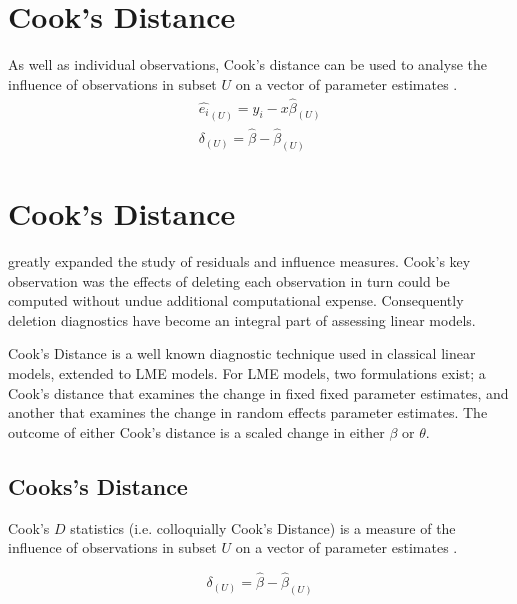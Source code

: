 \documentclass[12pt, a4paper]{article}
\begin{document}
	\section{Cook's Distance}
	As well as individual observations, Cook's distance can be used to analyse the influence of observations in subset $U$ on a vector of parameter estimates \citep{cook77}.
	\begin{eqnarray}
	\hat{e_{i}}_{(U)} = y_{i} - x\hat{\beta}_{(U)}\\
	\delta_{(U)} = \hat{\beta} - \hat{\beta}_{(U)}
	\end{eqnarray}

\section{Cook's Distance} %

\citet{cook77} greatly expanded the study of residuals and influence measures. Cook's key observation was the effects of deleting each observation in turn could be computed without undue additional computational expense. Consequently deletion diagnostics have become an integral part of assessing linear models.

Cook's Distance is a well known diagnostic technique used in classical linear models, extended to LME models.  For LME models, two formulations exist; a Cook's distance that examines the change in fixed fixed parameter estimates, and another that examines the change in random effects parameter estimates. The outcome of either Cook's distance is a scaled change in either $\beta$ or $\theta$.

\subsection{Cooks's Distance}
 Cook's $D$ statistics (i.e. colloquially Cook's Distance) is a measure of the influence of observations in subset $U$ on a vector of parameter estimates \citep{cook77}.

\[ \delta_{(U)} = \hat{\beta} - \hat{\beta}_{(U)}\]
\end{document}
